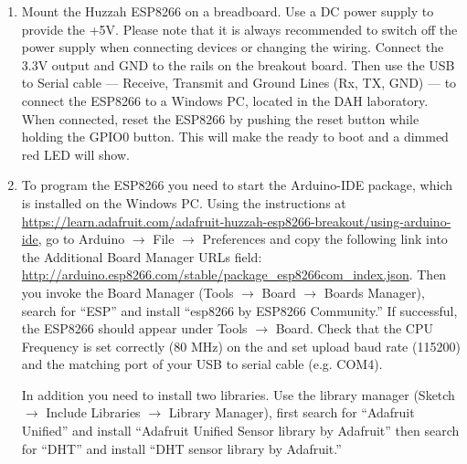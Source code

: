 \begin{enumerate}

\item Mount the Huzzah ESP8266 \microcontroller on a breadboard. 
Use a DC power supply to provide the +5V. 
Please note that it is always recommended to switch off the power supply when connecting devices or changing the wiring.
Connect the 3.3V output and GND to the rails on the breakout board. 
Then use the USB to Serial cable --- Receive, Transmit and Ground Lines (Rx, TX, GND) --- to connect the ESP8266 to a Windows PC, located in the DAH laboratory.
When connected, reset the ESP8266 by pushing the reset button while holding the GPIO0 button. 
This will make the \microcontroller ready to boot and a dimmed red LED will show.

\item To program the ESP8266 you need to start the Arduino-IDE package, which is installed on the Windows PC.
Using the instructions at \url{https://learn.adafruit.com/adafruit-huzzah-esp8266-breakout/using-arduino-ide}, go to Arduino $\rightarrow$ File $\rightarrow$ Preferences and copy the following link into
the Additional Board Manager URLs field: \url{http://arduino.esp8266.com/stable/package\_esp8266com\_index.json}.
Then you invoke the Board Manager (Tools $\rightarrow$ Board $\rightarrow$ Boards Manager), search for ``ESP'' and install ``esp8266 by ESP8266 Community.''
If successful, the ESP8266 should appear under Tools $\rightarrow$ Board.
Check that the CPU Frequency is set correctly (80 MHz) on the \microcontroller and set upload baud rate (115200) and the matching port of your USB to serial cable (e.g. COM4).

In addition you need to install two libraries.
Use the library manager (Sketch $\rightarrow$ Include Libraries $\rightarrow$ Library Manager), first search for ``Adafruit Unified'' and install ``Adafruit Unified Sensor library by Adafruit'' then search for ``DHT'' and install ``DHT sensor library by Adafruit.''



\end{enumerate}
